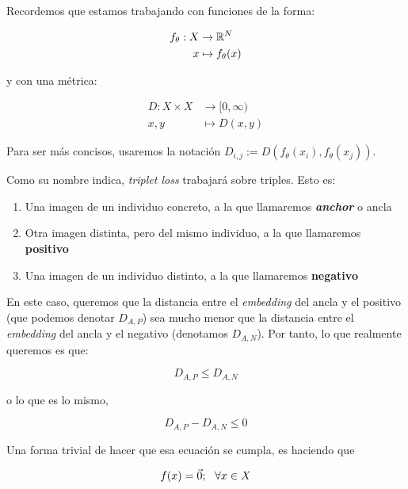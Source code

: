 Recordemos que estamos trabajando con funciones de la forma:

\begin{equation}
\begin{split}
    f_{\theta}: X & \to \mathbb{R}^N \\
    x & \mapsto f_{\theta}(x)
\end{split}
\end{equation}

y con una métrica:

\begin{equation}
\begin{split}
    D: X \times X & \to [0, \infty) \\
    x, y & \mapsto D(x, y)
\end{split}
\end{equation}

Para ser más concisos, usaremos la notación $D_{i, j} := D(f_{\theta}(x_i), f_{\theta}(x_j))$.

Como su nombre indica, \textit{triplet loss} trabajará sobre triples. Esto es:

\begin{enumerate}
    \item Una imagen de un individuo concreto, a la que llamaremos \textbf{\textit{anchor}} o ancla
    \item Otra imagen distinta, pero del mismo individuo, a la que llamaremos \textbf{positivo}
    \item Una imagen de un individuo distinto, a la que llamaremos \textbf{negativo}
\end{enumerate}

En este caso, queremos que la distancia entre el \textit{embedding} del ancla y el positivo (que podemos denotar $D_{A, P}$) sea mucho menor que la distancia entre el \textit{embedding} del ancla y el negativo (denotamos $D_{A, N}$). Por tanto, lo que realmente queremos es que:

\begin{equation}
    D_{A, P} \leq D_{A, N}
\end{equation}

o lo que es lo mismo,

\begin{equation}
    D_{A, P} - D_{A, N} \leq 0
\end{equation}

Una forma trivial de hacer que esa ecuación se cumpla, es haciendo que

\begin{equation}
    f(x) = \vec{0}; \ \  \forall x \in X
\end{equation}

